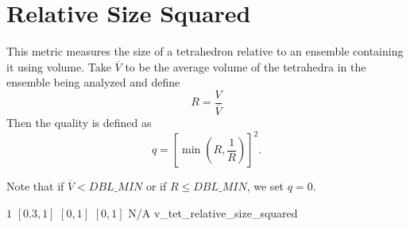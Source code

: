 \section{Relative Size Squared\label{s:tet-rel-size-squared}}

This metric measures the size of a tetrahedron relative to an ensemble
containing it using volume.
Take $\overline{V}$ to be the average volume of the tetrahedra in the ensemble being analyzed
and define
\[
R = \frac{V}{\overline{V}}
\]
Then the quality is defined as
\begin{equation*}
q =  \left[ \min\left( R, \frac {1}{R}\right) \right]^2.
\end{equation*}

Note that if $\overline{V} < DBL\_MIN$ or if $R \leq DBL\_MIN$, we set $q = 0$.

%
{$1$}%
{$[0.3,1]$}%
{$[0,1]$}%
{$[0,1]$}%
{N/A}%
{\cite{knu:03}}%
{v\_tet\_relative\_size\_squared}%

